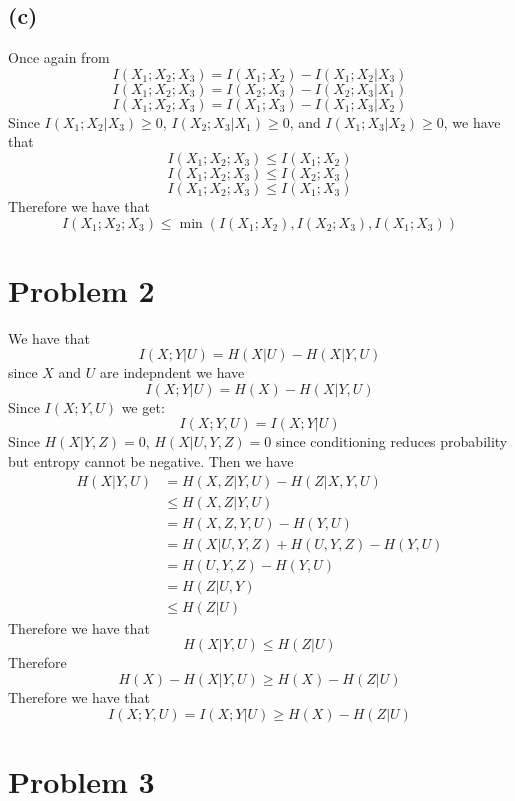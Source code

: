 \subsection*{(c)}
Once again from 
$$I(X_1;X_2;X_3)=I(X_1;X_2)-I(X_1;X_2|X_3)$$
$$I(X_1;X_2;X_3)=I(X_2;X_3)-I(X_2;X_3|X_1)$$
$$I(X_1;X_2;X_3)=I(X_1;X_3)-I(X_1;X_3|X_2)$$
Since $I(X_1;X_2|X_3)\geq0$, $I(X_2;X_3|X_1)\geq0$, and $I(X_1;X_3|X_2)\geq0$, we have that
$$I(X_1;X_2;X_3)\leq I(X_1;X_2)$$
$$I(X_1;X_2;X_3)\leq I(X_2;X_3)$$
$$I(X_1;X_2;X_3)\leq I(X_1;X_3)$$
Therefore we have that
$$I(X_1;X_2;X_3)\leq\min(I(X_1;X_2),I(X_2;X_3),I(X_1;X_3))$$
\section*{Problem 2}
We have that 
$$I(X;Y|U)=H(X|U)-H(X|Y,U)$$
since $X$ and $U$ are indepndent we have
$$I(X;Y|U)=H(X)-H(X|Y,U)$$
Since $I(X;Y,U)$ we get:
$$I(X;Y,U)=I(X;Y|U)$$
Since $H(X|Y,Z)=0$, $H(X|U,Y,Z)=0$ since conditioning reduces probability
but entropy cannot be negative. Then we have
\begin{align*}
    H(X|Y,U)&=H(X,Z|Y,U)-H(Z|X,Y,U)\\
    &\leq H(X,Z|Y,U)\\
    &= H(X,Z,Y,U)-H(Y,U)\\
    &=H(X|U,Y,Z)+H(U,Y,Z)-H(Y,U)\\
    &=H(U,Y,Z)-H(Y,U)\\
    &=H(Z|U,Y)\\
    &\leq H(Z|U)
\end{align*}
Therefore we have that 
$$H(X|Y,U)\leq H(Z|U)$$
Therefore 
$$H(X)-H(X|Y,U)\geq H(X)-H(Z|U)$$
Therefore we have that 
$$I(X;Y,U)=I(X;Y|U)\geq H(X)-H(Z|U)$$
\section*{Problem 3}
